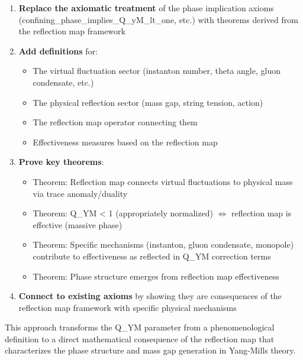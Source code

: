 \documentclass[11pt]{article}
\begin{document}
\begin{enumerate}
\item \textbf{Replace the axiomatic treatment} of the phase implication axioms (confining_phase_implies_Q_yM_lt_one, etc.) with theorems derived from the reflection map framework

\item \textbf{Add definitions} for:
  \begin{itemize}
  \item The virtual fluctuation sector (instanton number, theta angle, gluon condensate, etc.)
  \item The physical reflection sector (mass gap, string tension, action)
  \item The reflection map operator connecting them
  \item Effectiveness measures based on the reflection map
  \end{itemize}

\item \textbf{Prove key theorems}:
  \begin{itemize}
  \item Theorem: Reflection map connects virtual fluctuations to physical mass via trace anomaly/duality
  \item Theorem: Q_YM < 1 (appropriately normalized) $\Leftrightarrow$ reflection map is effective (massive phase)
  \item Theorem: Specific mechanisms (instanton, gluon condensate, monopole) contribute to effectiveness as reflected in Q_YM correction terms
  \item Theorem: Phase structure emerges from reflection map effectiveness
  \end{itemize}

\item \textbf{Connect to existing axioms} by showing they are consequences of the reflection map framework with specific physical mechanisms
\end{enumerate}

This approach transforms the Q_YM parameter from a phenomenological definition to a direct mathematical consequence of the reflection map that characterizes the phase structure and mass gap generation in Yang-Mills theory.
\end{document}
